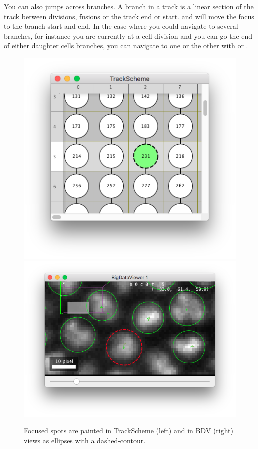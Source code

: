 You can also jumps across branches.
A branch in a track is a linear section of the track between divisions, fusions or the track end or start.
\keys{\Alt+\arrowkeyup} and \keys{\Alt+\arrowkeydown} will move the focus to the branch start and end.
In the case where you could navigate to several branches, for instance you are currently at a cell division and you can go the end of either daughter cells branches, you can navigate to one or the other with \keys{\Alt+\arrowkeydown} or \keys{\ctrl+\Alt+\arrowkeydown}.


\begin{figure}
    \centering
    \includegraphics[height=0.25\textheight,trim=0.5cm .5cm .5cm .5cm,clip]{figures/Mastodon_FocusInTrackScheme.png}
    \includegraphics[height=0.25\textheight,trim=0.5cm .5cm .5cm .5cm,clip]{figures/Mastodon_FocusInBDV.png}
    \caption{Focused spots are painted in TrackScheme (left) and in BDV (right) views as ellipses with a dashed-contour.}
     \label{fig:FocusedSpots}
\end{figure}  

